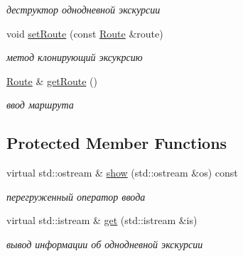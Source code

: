 \begin{DoxyCompactItemize}
\begin{DoxyCompactList}\small\item\em деструктор однодневной экскурсии \end{DoxyCompactList}\item 
\hypertarget{class_oneday_excursion_aa9379cb2bcc8d6bd5ec832ec438bfcff}{}void \hyperlink{class_oneday_excursion_aa9379cb2bcc8d6bd5ec832ec438bfcff}{set\+Route} (const \hyperlink{class_route}{Route} \&route)\label{class_oneday_excursion_aa9379cb2bcc8d6bd5ec832ec438bfcff}

\begin{DoxyCompactList}\small\item\em метод клонирующий эксукрсию \end{DoxyCompactList}\item 
\hypertarget{class_oneday_excursion_ac000b64a432e5d629c146c67afebc572}{}\hyperlink{class_route}{Route} \& \hyperlink{class_oneday_excursion_ac000b64a432e5d629c146c67afebc572}{get\+Route} ()\label{class_oneday_excursion_ac000b64a432e5d629c146c67afebc572}

\begin{DoxyCompactList}\small\item\em ввод маршрута \end{DoxyCompactList}\end{DoxyCompactItemize}
\subsection*{Protected Member Functions}
\begin{DoxyCompactItemize}
\item 
\hypertarget{class_oneday_excursion_a50e0efe6531857972e72d8085a36e3c5}{}virtual std\+::ostream \& \hyperlink{class_oneday_excursion_a50e0efe6531857972e72d8085a36e3c5}{show} (std\+::ostream \&os) const \label{class_oneday_excursion_a50e0efe6531857972e72d8085a36e3c5}

\begin{DoxyCompactList}\small\item\em перегруженный оператор ввода \end{DoxyCompactList}\item 
\hypertarget{class_oneday_excursion_a7138aa029f429ccde71a79706bcf9f89}{}virtual std\+::istream \& \hyperlink{class_oneday_excursion_a7138aa029f429ccde71a79706bcf9f89}{get} (std\+::istream \&is)\label{class_oneday_excursion_a7138aa029f429ccde71a79706bcf9f89}

\begin{DoxyCompactList}\small\item\em вывод информации об однодневной экскурсии \end{DoxyCompactList}\end{DoxyCompactItemize}
